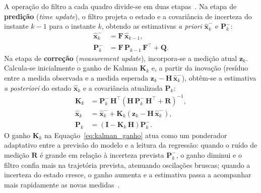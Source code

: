 A operação do filtro a cada quadro divide-se em duas etapas~\cite{welch2006kalman}. Na etapa de \textbf{predição} (\textit{time update}), o filtro projeta o estado e a covariância de incerteza do instante $k-1$ para o instante $k$, obtendo as estimativas \textit{a priori} $\hat{\mathbf{x}}_k^-$ e $\mathbf{P}_k^-$:
\begin{align}
    \hat{\mathbf{x}}_k^- &= \mathbf{F}\,\hat{\mathbf{x}}_{k-1}, \label{eq:kalman_pred_x} \\
    \mathbf{P}_k^- &= \mathbf{F}\,\mathbf{P}_{k-1}\,\mathbf{F}^\top + \mathbf{Q}. \label{eq:kalman_pred_p}
\end{align}
Na etapa de \textbf{correção} (\textit{measurement update}), incorpora-se a medição atual $\mathbf{z}_k$. Calcula-se inicialmente o ganho de Kalman $\mathbf{K}_k$ e, a partir da inovação (resíduo entre a medida observada e a medida esperada $\mathbf{z}_k - \mathbf{H}\,\hat{\mathbf{x}}_k^-$), obtêm-se a estimativa \textit{a posteriori} do estado $\hat{\mathbf{x}}_k$ e a covariância atualizada $\mathbf{P}_k$:
\begin{align}
    \mathbf{K}_k &= \mathbf{P}_k^-\,\mathbf{H}^\top \left(\mathbf{H}\,\mathbf{P}_k^-\,\mathbf{H}^\top + \mathbf{R}\right)^{-1}, \label{eq:kalman_ganho} \\
    \hat{\mathbf{x}}_k &= \hat{\mathbf{x}}_k^- + \mathbf{K}_k\left(\mathbf{z}_k - \mathbf{H}\,\hat{\mathbf{x}}_k^-\right), \label{eq:kalman_corr_x} \\
    \mathbf{P}_k &= \left(\mathbf{I} - \mathbf{K}_k\,\mathbf{H}\right)\mathbf{P}_k^-. \label{eq:kalman_corr_p}
\end{align}
O ganho $\mathbf{K}_k$ na Equação~\ref{eq:kalman_ganho} atua como um ponderador adaptativo entre a previsão do modelo e a leitura da regressão: quando o ruído de medição $\mathbf{R}$ é grande em relação à incerteza prevista $\mathbf{P}_k^-$, o ganho diminui e o filtro confia mais na trajetória prevista, atenuando oscilações bruscas; quando a incerteza do estado cresce, o ganho aumenta e a estimativa passa a acompanhar mais rapidamente as novas medidas~\cite{welch2006kalman}.

